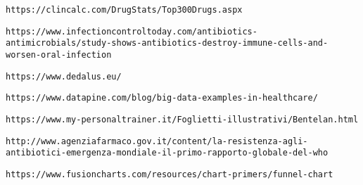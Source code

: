 \begin{thebibliography}{}
	\texttt{https://clincalc.com/DrugStats/Top300Drugs.aspx}
	
	\texttt{https://www.infectioncontroltoday.com/antibiotics-antimicrobials/study-shows-antibiotics-destroy-immune-cells-and-worsen-oral-infection}
	
	\texttt{https://www.dedalus.eu/}
	
	\texttt{https://www.datapine.com/blog/big-data-examples-in-healthcare/}
	
	\texttt{https://www.my-personaltrainer.it/Foglietti-illustrativi/Bentelan.html}
	
	\texttt{http://www.agenziafarmaco.gov.it/content/la-resistenza-agli-antibiotici-emergenza-mondiale-il-primo-rapporto-globale-del-who}
	
	\texttt{https://www.fusioncharts.com/resources/chart-primers/funnel-chart}
	
\end{thebibliography}
	